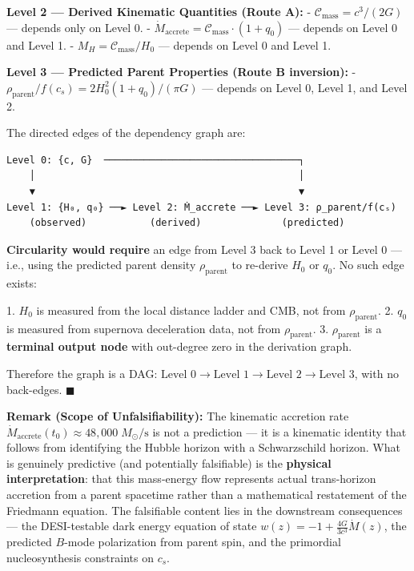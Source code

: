 \documentclass[11pt,a4paper]{article}
\theoremstyle{definition}\newtheorem{definition}{Definition}
\theoremstyle{remark}\newtheorem{remark}{Remark}
\begin{document}
\textbf{Level 2 — Derived Kinematic Quantities (Route A):}
- $\mathcal{C}_{\text{mass}} = c^3 / (2G)$ — depends only on Level 0.
- $\dot{M}_{\text{accrete}} = \mathcal{C}_{\text{mass}} \cdot (1 + q_0)$ — depends on Level 0 and Level 1.
- $M_H = \mathcal{C}_{\text{mass}} / H_0$ — depends on Level 0 and Level 1.

\textbf{Level 3 — Predicted Parent Properties (Route B inversion):}
- $\rho_{\text{parent}} / f(c_s) = 2H_0^2 (1+q_0) / (\pi G)$ — depends on Level 0, Level 1, and Level 2.

The directed edges of the dependency graph are:

\begin{verbatim}Level 0: {c, G}  ──────────────────────────────────┐
    │                                              │
    ▼                                              ▼
Level 1: {H₀, q₀} ──► Level 2: Ṁ_accrete ──► Level 3: ρ_parent/f(cₛ)
    (observed)           (derived)              (predicted)
\end{verbatim}

\textbf{Circularity would require} an edge from Level 3 back to Level 1 or Level 0 — i.e., using the predicted parent density $\rho_{\text{parent}}$ to re-derive $H_0$ or $q_0$. No such edge exists:

1. $H_0$ is measured from the local distance ladder and CMB, not from $\rho_{\text{parent}}$.
2. $q_0$ is measured from supernova deceleration data, not from $\rho_{\text{parent}}$.
3. $\rho_{\text{parent}}$ is a \textbf{terminal output node} with out-degree zero in the derivation graph.

Therefore the graph is a DAG: $\text{Level 0} \to \text{Level 1} \to \text{Level 2} \to \text{Level 3}$, with no back-edges. $\blacksquare$

\textbf{Remark (Scope of Unfalsifiability):} The kinematic accretion rate $\dot{M}_{\text{accrete}}(t_0) \approx 48{,}000 \; M_\odot/\text{s}$ is not a prediction — it is a kinematic identity that follows from identifying the Hubble horizon with a Schwarzschild horizon. What is genuinely predictive (and potentially falsifiable) is the \textbf{physical interpretation}: that this mass-energy flow represents actual trans-horizon accretion from a parent spacetime rather than a mathematical restatement of the Friedmann equation. The falsifiable content lies in the downstream consequences — the DESI-testable dark energy equation of state $w(z) = -1 + \frac{4G}{3c^3}\dot{M}(z)$, the predicted $B$-mode polarization from parent spin, and the primordial nucleosynthesis constraints on $c_s$.
\end{document}
